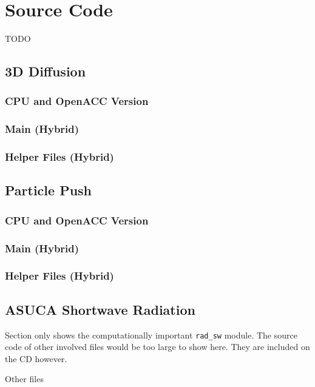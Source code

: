 \chapter{Source Code} \label{cha:appendixSource}
TODO

\section{3D Diffusion} \label{sec:sourceDiffusion}

\subsection{CPU and OpenACC Version}

\subsection{Main (Hybrid)}

\subsection{Helper Files (Hybrid)}

\section{Particle Push} \label{sec:sourceParticle}

\subsection{CPU and OpenACC Version}

\subsection{Main (Hybrid)}

\subsection{Helper Files (Hybrid)}

\section{ASUCA Shortwave Radiation} \label{sec:sourceRadSW}

Section only shows the computationally important \verb|rad_sw| module. The source code of other involved files would be too large to show here. They are included on the CD however.

Other files 
